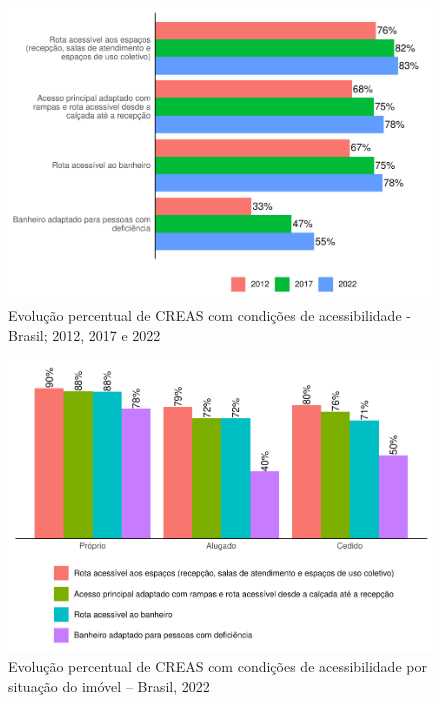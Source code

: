 \documentclass[
  brazilian]{report}
\begin{document}
\begin{figure}
\includegraphics{Censo-SUAS-2022_files/figure-latex/creas-acessibilidade-1} \caption[Evolução percentual de CREAS com condições de acessibilidade - Brasil]{Evolução percentual de CREAS com condições de acessibilidade - Brasil; 2012, 2017 e 2022}\label{fig:creas-acessibilidade}
\end{figure}

\begin{figure}
\includegraphics{Censo-SUAS-2022_files/figure-latex/CREAS-acessibilidade-situacao-1} \caption[Evolução percentual de CREAS com condições de acessibilidade por situação do imóvel – Brasil, 2022]{Evolução percentual de CREAS com condições de acessibilidade por situação do imóvel – Brasil, 2022}\label{fig:CREAS-acessibilidade-situacao}
\end{figure}
\end{document}
